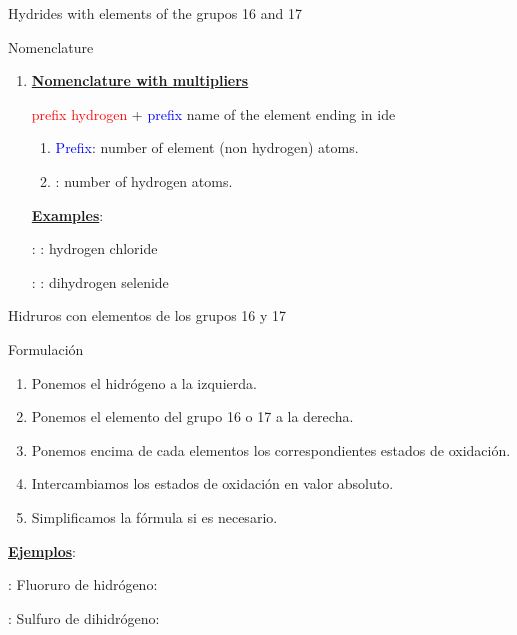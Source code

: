 \documentclass{beamer}
\begin{document}
\begin{frame}[t]{ Hydrides with elements of the grupos 16 and 17}\vspace{10pt}
    
    \begin{alertblock}{\Large Nomenclature}
        \begin{enumerate}[label=\itembolascolor{\arabic*}{mDarkTeal}]
            \item \textbf{\uline{Nomenclature with multipliers}}
                  \begin{center}

                      \textcolor{red}{prefix} \textcolor{red}{hydrogen} + \textcolor{blue}{prefix}  \textcolor{azulF}{name of the element  ending in}  \textcolor{green!50!black}{ide}   
                  \end{center}

                  \begin{enumerate}[label=\textcolor{red}{$\bullet$}]
                      \item \textcolor{blue}{Prefix}: number of element (non hydrogen) atoms.
                      \item {}: number of hydrogen atoms.
                  \end{enumerate}

                  \textbf{\uline{Examples}}:

                   : : hydrogen chloride

                   : : dihydrogen selenide
        \end{enumerate}
    \end{alertblock}
\end{frame}

\begin{frame}[t]{Hidruros con elementos de los grupos 16 y 17}
    \begin{exampleblock}{\Large Formulación}\vspace*{5pt}
        \begin{enumerate}[label=\itembolascolor{\arabic*}{mDarkTeal}]
            \item Ponemos el hidrógeno a la izquierda.
            \item Ponemos el elemento del grupo 16 o 17 a la derecha.
            \item Ponemos encima de cada elementos los correspondientes estados de oxidación.
            \item Intercambiamos los estados de oxidación en valor absoluto.
            \item Simplificamos la fórmula si es necesario.
        \end{enumerate}
        \textbf{\uline{Ejemplos}}:

         : Fluoruro de hidrógeno: 

         : Sulfuro de dihidrógeno: 
    \end{exampleblock}
\end{frame}
\end{document}
